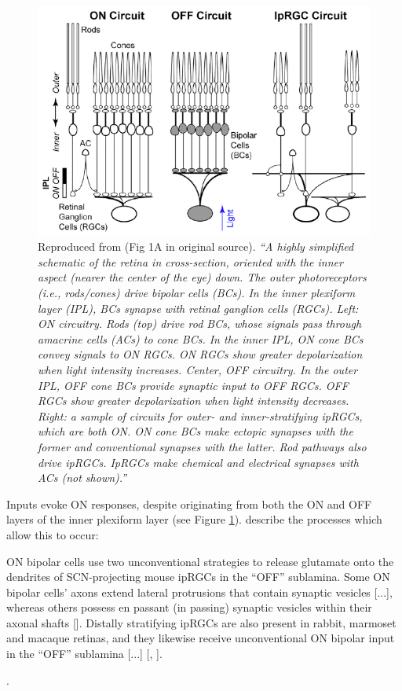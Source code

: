 \begin{figure}[htbp]
\includegraphics[max width=\textwidth, center]{figs/LitRev/do.png}
\caption{Reproduced from \citet{do_melanopsin_2019} (Fig 1A in original source). \textit{``A highly simplified schematic of the retina in cross-section, oriented with the inner aspect (nearer the center of the eye) down. The outer photoreceptors (i.e., rods/cones) drive bipolar cells (BCs). In the inner plexiform layer (IPL), BCs synapse with retinal ganglion cells (RGCs). Left: ON circuitry. Rods (top) drive rod BCs, whose signals pass through amacrine cells (ACs) to cone BCs. In the inner IPL, ON cone BCs convey signals to ON RGCs. ON RGCs show greater depolarization when light intensity increases. Center, OFF circuitry. In the outer IPL, OFF cone BCs provide synaptic input to OFF RGCs. OFF RGCs show greater depolarization when light intensity decreases. Right: a sample of circuits for outer- and inner-stratifying ipRGCs, which are both ON. ON cone BCs make ectopic synapses with the former and conventional synapses with the latter. Rod pathways also drive ipRGCs. IpRGCs make chemical and electrical synapses with ACs (not shown).''}}
\label{fig:do}
\end{figure}

Inputs evoke ON responses, despite originating from both the ON and OFF layers of the inner plexiform layer (see Figure \ref{fig:do}). \citet{graham_melanopsin-expressing_2016} describe the processes which allow this to occur: 

\begin{itquote}{}
ON bipolar cells use two unconventional strategies to release glutamate onto the dendrites of SCN-projecting mouse ipRGCs in the “OFF” sublamina. Some ON bipolar cells’ axons extend lateral protrusions that contain synaptic vesicles [...], whereas others possess en passant (in passing) synaptic vesicles within their axonal shafts [\citet{dumitrescu_ectopic_2009}]. Distally stratifying ipRGCs are also present in rabbit, marmoset and macaque retinas, and they likewise receive unconventional ON bipolar input in the “OFF” sublamina [...] [\citet{hoshi_inputs_2009}, \citet{grunert_bipolar_2011}].
\end{itquote}.

